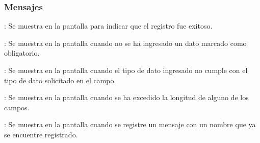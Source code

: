 \subsubsection{Mensajes}

\begin{Citemize}
	\item {}: Se muestra en la pantalla  para indicar que el registro fue exitoso.
	\item {}: Se muestra en la pantalla  cuando no se ha ingresado un dato marcado como obligatorio.
	\item {}: Se muestra en la pantalla  cuando el tipo de dato ingresado no cumple con el tipo de dato solicitado en el campo.
	\item {}: Se muestra en la pantalla  cuando se ha excedido la longitud de alguno de los campos.
	\item {}: Se muestra en la pantalla  cuando se registre un mensaje con un nombre que ya se encuentre registrado.
\end{Citemize}

